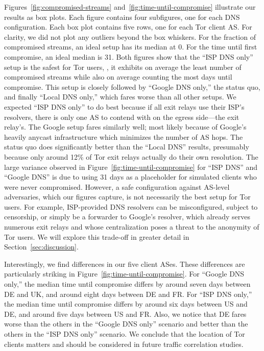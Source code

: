 Figures~\ref{fig:compromised-streams} and~\ref{fig:time-until-compromise}
illustrate our results as box plots.  Each figure contains four subfigures, one
for each DNS configuration.  Each box plot contains five rows, one for each Tor
client AS.  For clarity, we did not plot any outliers beyond the box whiskers.
For the fraction of compromised streams, an ideal setup has its median at 0.
For the time until first compromise, an ideal median is 31.  Both figures show
that the ``ISP DNS only'' setup is the safest for Tor users, \ie, it exhibits on
average the least number of compromised streams while also on average counting
the most days until compromise.  This setup is closely followed by ``Google DNS
only,'' the status quo, and finally ``Local DNS only,'' which fares worse than
all other setups.  We expected ``ISP DNS only'' to do best because if all exit
relays use their ISP's resolvers, there is only one AS to contend with on the
egress side---the exit relay's.  The Google setup fares similarly well; most
likely because of Google's heavily anycast infrastructure which minimizes the
number of AS hops.  The status quo does significantly better than the ``Local
DNS'' results, presumably because only around 12\% of Tor exit relays actually
do their own resolution.  The large variance observed in
Figure~\ref{fig:time-until-compromise} for ``ISP DNS'' and ``Google DNS'' is due
to using 31 days as a placeholder for simulated clients who were never
compromised.  However, a safe configuration against AS-level adversaries, which
our figures capture, is not necessarily the best setup for Tor users.  For
example, ISP-provided DNS resolvers can be misconfigured, subject to censorship,
or simply be a forwarder to Google's resolver, which already serves numerous
exit relays and whose centralization poses a threat to the anonymity of Tor
users.  We will explore this trade-off in greater detail in
Section~\ref{sec:discussion}.

Interestingly, we find differences in our five client ASes.  These differences
are particularly striking in Figure~\ref{fig:time-until-compromise}.  For
``Google DNS only,'' the median time until compromise differs by around seven
days between DE and UK, and around eight days between DE and FR.  For ``ISP DNS
only,'' the median time until compromise differs by around six days between US
and DE, and around five days between US and FR.  Also, we notice that DE fares
worse than the others in the ``Google DNS only'' scenario and better than the
others in the ``ISP DNS only'' scenario.  We conclude that the location of Tor
clients matters and should be considered in future traffic correlation studies.
